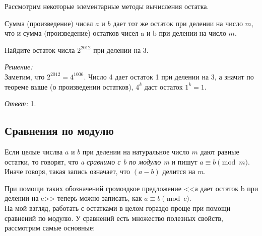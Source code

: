 \documentclass[11pt]{article}
\begin{document}
Рассмотрим некоторые элементарные методы вычисления остатка.

\begin{theorem}

	Сумма (произведение) чисел $a$ и $b$ дает тот же остаток при делении на число  $m$, что и сумма (произведение) остатков чисел a и b при делении на число $m$.

\end{theorem}

\begin{example}
	Найдите остаток числа $2^{2012}$ при делении на 3.
\end{example}
\textit{Решение:}\\
Заметим, что $2^{2012} = 4^{1006}$. Число 4  дает остаток 1 при делении на 3, а значит по теореме выше (о произведении остатков), $4^k$ даст остаток $1^k = 1$.

\textit{Ответ:} 1.

\subsection{Сравнения по модулю}
\begin{definition}
	Если целые числва $a$ и $b$ при делении на натуральное число $m$ дают равные остатки, то говорят, что \emph{a сравнимо с b по модулю m} и пишут $a \equiv b \pmod m$.
Иначе говоря, такая запись означает, что $(a - b)$ делится на $m$.
\end{definition}

При помощи таких обозначений громоздкое предложение <<а дает остаток b при делении на c>> теперь можно записать, как $a \equiv b \pmod c$.\\

На мой взгляд, работать с остатками в целом гораздо проще при помощи сравнений по модулю. У сравнений есть множество полезных свойств, рассмотрим самые основные:\\
\end{document}
